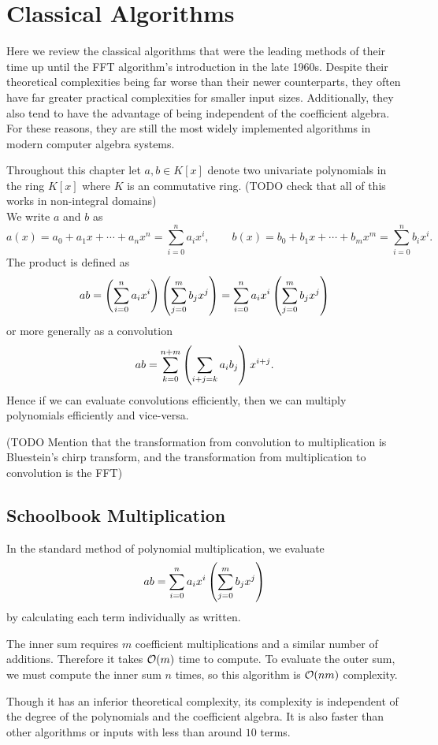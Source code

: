 \chapter{Classical Algorithms}\label{chp:classical}

Here we review the classical algorithms that were the leading methods of their time up until the FFT algorithm's introduction in the late 1960s. Despite their theoretical complexities being far worse than their newer counterparts, they often have far greater practical complexities for smaller input sizes. Additionally, they also tend to have the advantage of being independent of the coefficient algebra. For these reasons, they are still the most widely implemented algorithms in modern computer algebra systems.

Throughout this chapter let $a, b \in K[x]$ denote two univariate polynomials in the ring $K[x]$ where $K$ is an commutative ring. (TODO check that all of this works in non-integral domains)\\
We write $a$ and $b$ as
\[
    a(x) = a_0 + a_1x + \cdots + a_nx^n = \sum^n_{i=0} a_ix^i, \qquad b(x) = b_0 + b_1x + \cdots + b_mx^m = \sum^n_{i=0} b_ix^i.
\]
The product is defined as
\[
    ab = \left(\sum^n_{i=0} a_i x^i\right)\left(\sum^m_{j=0} b_j x^j\right) = \sum^n_{i=0} a_ix^i\left(\sum^m_{j=0} b_j x^j\right)
\]
or more generally as a convolution
\[
    ab = \sum^{n + m}_{k=0} \left(\sum_{i + j = k}a_ib_j\right) x^{i + j}.
\]
Hence if we can evaluate convolutions efficiently, then we can multiply polynomials efficiently and vice-versa.

(TODO Mention that the transformation from convolution to multiplication is Bluestein's chirp transform, and the transformation from multiplication to convolution is the FFT)

\section{Schoolbook Multiplication}
\label{sec:prelim-schoolbook}

In the standard method of polynomial multiplication, we evaluate
\[
    ab = \sum^n_{i=0} a_ix^i\left(\sum^m_{j=0} b_j x^j\right)
\]
by calculating each term individually as written.

The inner sum requires $m$ coefficient multiplications and a similar number of additions. Therefore it takes $\mathcal O(m)$ time to compute. To evaluate the outer sum, we must compute the inner sum $n$ times, so this algorithm is $\mathcal O(nm)$ complexity.

Though it has an inferior theoretical complexity, its complexity is independent of the degree of the polynomials and the coefficient algebra. It is also faster than other algorithms or inputs with less than around $10$ terms.

